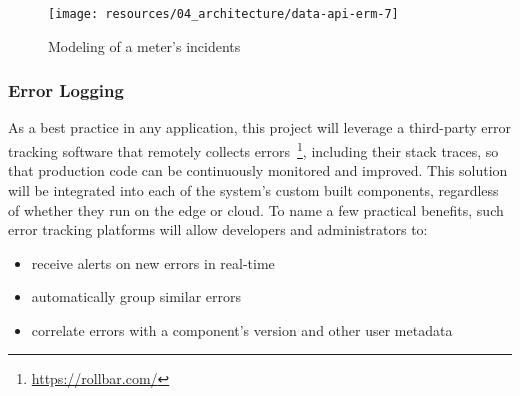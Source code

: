 \begin{figure}[hbt]
  \centering
  \texttt{[image: resources/04\_architecture/data-api-erm-7]}
  \caption{Modeling of a meter's incidents}
  \label{fig:data-api-erm-meter-incident}
\end{figure}

\FloatBarrier


\subsubsection{Error Logging}
\label{sec:error-logging}

As a best practice in any application, this project will leverage a third-party error tracking software that remotely collects errors~\footnote{\url{https://rollbar.com/}}, including their stack traces, so that production code can be continuously monitored and improved. This solution will be integrated into each of the system's custom built components, regardless of whether they run on the edge or cloud. To name a few practical benefits, such error tracking platforms will allow developers and administrators to:

\begin{itemize}
  \item receive alerts on new errors in real-time
  \item automatically group similar errors
  \item correlate errors with a component's version and other user metadata
\end{itemize}
